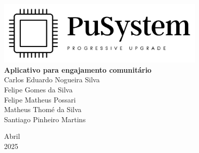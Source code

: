 \documentclass[a4paper, 12pt]{article}
\begin{document}

\begin{titlepage}
	\begin{center}
	

        \includegraphics[width=10cm]{Logo Transparente Preto.png} \\ 
		\vspace{115pt}
        \textbf{\Huge{Aplicativo para engajamento comunitário}}\\
        
		\vspace{115pt}
        Carlos Eduardo Nogueira Silva \\
        Felipe Gomes da Silva \\
        Felipe Matheus Possari \\
        Matheus Thomé da Silva\\ 
        Santiago Pinheiro Martins \\
	\end{center}
	
	
	\vspace{1cm}
	\begin{center}
		\vspace{\fill}
		 Abril \\
		 2025
			\end{center}
\end{titlepage}

\newpage
\tableofcontents
\thispagestyle{empty}

\newpage
\pagestyle{fancy}

\fancyhead[L]{\thepage}
\fancyhead[C]{\nouppercase{\leftmark}}%
\fancyfoot[R]{}  %
\fancyfoot[L]{}  %
\setlength\headheight{26pt}  %
\end{document}
